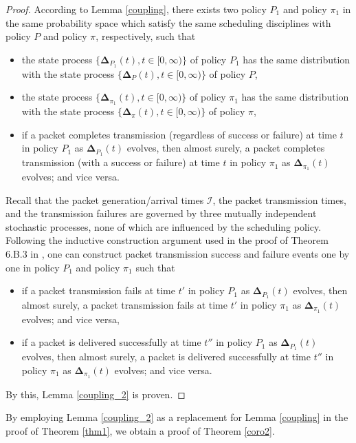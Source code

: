 {\begin{proof}
According to Lemma \ref{coupling}, there exists two policy $P_1$ and policy $\pi_1$ in the same probability space which satisfy the same scheduling disciplines with policy $P$ and policy $\pi$, respectively,  such that 
\begin{itemize}
\itemsep0em 
\item[1.] the state process $\{\bm\Delta_{P_1}(t),t\in [0,\infty)\}$ of policy $P_1$ has the same distribution with the state process $\{\bm\Delta_{P}(t),t\in [0,\infty)\}$ of policy $P$,
\item[2.] the state process $\{\bm\Delta_{\pi_1}(t),t\in [0,\infty)\}$ of policy $\pi_1$ has the same distribution with the state process $\{\bm\Delta_{\pi}(t),t\in [0,\infty)\}$  of policy $\pi$,
\item[3.] if a packet completes transmission (regardless of success or failure) at time $t$ in policy $P_1$ as $\bm\Delta_{P_1}(t)$ evolves, then almost surely, a packet completes transmission (with a success or failure) at time $t$ in policy $\pi_1$ as $\bm\Delta_{\pi_1}(t)$ evolves; and vice versa. 
\end{itemize} 

Recall that the packet generation/arrival times $\mathcal I$, the packet transmission times, and the transmission failures are governed by three mutually independent stochastic processes, none of which are influenced by the scheduling policy. Following the inductive construction argument used in the proof of Theorem 6.B.3 in \cite{StochasticOrderBook}, one can construct packet transmission success and failure events one by one in policy $P_1$ and policy $\pi_1$ such that 
\begin{itemize}
\itemsep0em 
\item[1.] if a packet transmission fails at time $t'$ in policy $P_1$ as $\bm\Delta_{P_1}(t)$ evolves, then almost surely, a packet transmission fails at time $t'$ in policy $\pi_1$ as $\bm\Delta_{\pi_1}(t)$ evolves; and vice versa,
\item[2.] if a packet is delivered successfully at time $t''$ in policy $P_1$ as $\bm\Delta_{P_1}(t)$ evolves, then almost surely, a packet is delivered successfully at time $t''$ in policy $\pi_1$ as $\bm\Delta_{\pi_1}(t)$ evolves; and vice versa.
\end{itemize} 
By this, Lemma \ref{coupling_2} is proven. 
\end{proof}

By employing Lemma \ref{coupling_2} as a replacement for Lemma \ref{coupling} in the proof of Theorem \ref{thm1}, we obtain a proof of Theorem \ref{coro2}.
}


